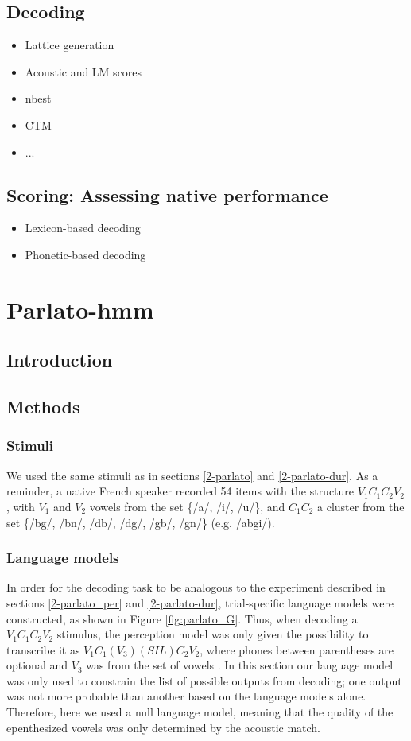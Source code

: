 \subsection{Decoding}
\begin{itemize}
\item Lattice generation
\item Acoustic and LM scores 
\item nbest
\item CTM
\item ...
\end{itemize}

\subsection{Scoring: Assessing native performance}
\begin{itemize}
\item Lexicon-based decoding
\item Phonetic-based decoding
\end{itemize}

\newpage
\section{{\color{red}Parlato-hmm}} \label{3-parlato-hmm}
\subsection{Introduction}
\subsection{Methods}
\subsubsection{Stimuli}
We used the same stimuli as in sections \ref{2-parlato} and \ref{2-parlato-dur}. As a reminder, a native French speaker recorded 54 items with the structure $V_{1}C_{1}C_{2}V_{2}$, with $V_{1}$ and $V_{2}$ vowels from the set \{/a/, /i/, /u/\}, and $C_{1}C_{2}$ a cluster from the set \{/bg/, /bn/, /db/, /dg/, /gb/, /gn/\} (e.g. /abgi/).

\subsubsection{Language models}
In order for the decoding task to be analogous to the experiment described in sections \ref{2-parlato_per} and \ref{2-parlato-dur}, trial-specific language models were constructed, as shown in Figure \ref{fig:parlato_G}. Thus, when decoding a $V_{1}C_{1}C_{2}V_{2}$ stimulus, the perception model was only given the possibility to transcribe it as $V_{1}C_{1}(V_{3})(SIL)C_{2}V_{2}$, where phones between parentheses are optional and $V_{3}$ was from the set of vowels . In this section our language model was only used to constrain the list of possible outputs from decoding; one output was not more probable than another based on the language models alone. Therefore, here we used a null language model, meaning that the quality of the epenthesized vowels was only determined by the acoustic match.


